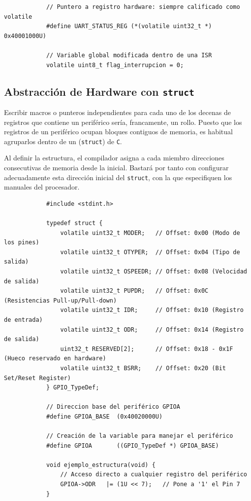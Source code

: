 \documentclass[../main.tex]{subfiles}
\begin{document}
        \begin{lstlisting}
            // Puntero a registro hardware: siempre calificado como volatile
            #define UART_STATUS_REG (*(volatile uint32_t *) 0x40001000U)

            // Variable global modificada dentro de una ISR
            volatile uint8_t flag_interrupcion = 0; 
        \end{lstlisting}

    \subsection{Abstracción de Hardware con \lstinline|struct|}

        Escribir macros o punteros independientes para cada uno de los decenas de registros que contiene un periférico sería, francamente, un rollo. Puesto que los registros de un periférico ocupan bloques contiguos de memoria, es habitual agruparlos dentro de un (\lstinline|struct|) de \texttt{C}.

        Al definir la estructura, el compilador asigna a cada miembro direcciones consecutivas de memoria desde la inicial. Bastará por tanto con configurar adecuadamente esta dirección inicial del \lstinline|struct|, con la que especifiquen los manuales del procesador. 

        \begin{lstlisting}
            #include <stdint.h>

            typedef struct {
                volatile uint32_t MODER;   // Offset: 0x00 (Modo de los pines)
                volatile uint32_t OTYPER;  // Offset: 0x04 (Tipo de salida)
                volatile uint32_t OSPEEDR; // Offset: 0x08 (Velocidad de salida)
                volatile uint32_t PUPDR;   // Offset: 0x0C (Resistencias Pull-up/Pull-down)
                volatile uint32_t IDR;     // Offset: 0x10 (Registro de entrada)
                volatile uint32_t ODR;     // Offset: 0x14 (Registro de salida)
                uint32_t RESERVED[2];      // Offset: 0x18 - 0x1F (Hueco reservado en hardware)
                volatile uint32_t BSRR;    // Offset: 0x20 (Bit Set/Reset Register)
            } GPIO_TypeDef;

            // Direccion base del periférico GPIOA 
            #define GPIOA_BASE  (0x40020000U)

            // Creación de la variable para manejar el periférico
            #define GPIOA       ((GPIO_TypeDef *) GPIOA_BASE)

            void ejemplo_estructura(void) {
                // Acceso directo a cualquier registro del periférico
                GPIOA->ODR   |= (1U << 7);   // Pone a '1' el Pin 7
            }
        \end{lstlisting}
\end{document}
